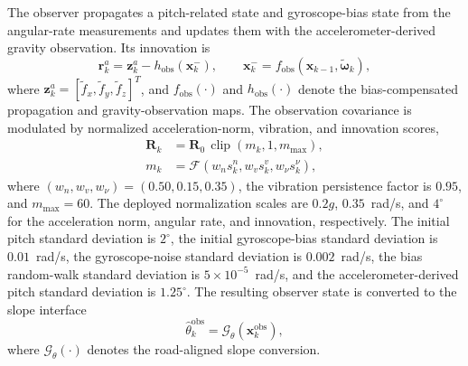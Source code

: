 \documentclass{ieeeaccess}
\begin{document}
The observer propagates a pitch-related state and gyroscope-bias state from the
angular-rate measurements and updates them with the accelerometer-derived
gravity observation. Its innovation is
\begin{equation}
\bm r_k^{a}=\bm z_k^{a}-h_{\mathrm{obs}}(\bm x_k^{-}),
\qquad
\bm x_k^{-}=f_{\mathrm{obs}}(\bm x_{k-1},
\tilde{\bm\omega}_k),
\label{eq:qualified_observer_prediction}
\end{equation}
where $\bm z_k^{a}=[\tilde f_x,\tilde f_y,\tilde f_z]^{T}$, and
$f_{\mathrm{obs}}(\cdot)$ and $h_{\mathrm{obs}}(\cdot)$ denote the
bias-compensated propagation and gravity-observation maps. The observation
covariance is modulated by normalized acceleration-norm, vibration, and
innovation scores,
\begin{equation}
\begin{aligned}
\bm R_k&=\bm R_0\,
\operatorname{clip}\!\left(m_k,1,m_{\max}\right),\\
m_k&=\mathcal F\!\left(
w_n s_k^{n},w_v s_k^{v},w_{\nu}s_k^{\nu}\right),
\end{aligned}
\label{eq:qualified_observer_adaptation}
\end{equation}
where $(w_n,w_v,w_{\nu})=(0.50,0.15,0.35)$, the vibration persistence factor
is $0.95$, and $m_{\max}=60$. The deployed normalization scales are
$0.2g$, $0.35$~rad/s, and $4^{\circ}$ for the acceleration norm, angular
rate, and innovation, respectively. The initial pitch standard deviation is
$2^{\circ}$, the initial gyroscope-bias standard deviation is
$0.01$~rad/s, the gyroscope-noise standard deviation is $0.002$~rad/s, the
bias random-walk standard deviation is $5\times10^{-5}$~rad/s, and the
accelerometer-derived pitch standard deviation is $1.25^{\circ}$. The
resulting observer state is converted to the slope interface
\begin{equation}
\hat\theta_k^{\mathrm{obs}}=\mathcal G_{\theta}(\bm x_k^{\mathrm{obs}}),
\label{eq:qualified_observer_grade_output}
\end{equation}
where $\mathcal G_{\theta}(\cdot)$ denotes the road-aligned slope conversion.
\end{document}
